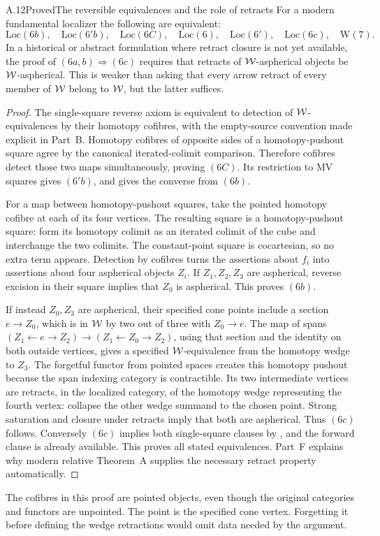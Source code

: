 \begin{claim}{A.12}{Proved}{The reversible equivalences and the role of retracts}
For a modern fundamental localizer the following are equivalent:
\[
\mathrm{Loc}(6b),\quad\mathrm{Loc}(6'b),\quad\mathrm{Loc}(6C),
\quad\mathrm{Loc}(6),\quad\mathrm{Loc}(6'),\quad\mathrm{Loc}(6c),
\quad\mathrm{W}(7).
\]
In a historical or abstract formulation where retract closure is not yet available, the proof of $(6a,b)\Rightarrow(6c)$ requires that retracts of $\mathcal{W}$-aspherical objects be $\mathcal{W}$-aspherical. This is weaker than asking that every arrow retract of every member of $\mathcal{W}$ belong to $\mathcal{W}$, but the latter suffices.
\end{claim}
\begin{proof}
The single-square reverse axiom is equivalent to detection of $\mathcal{W}$-equivalences by their homotopy cofibres, with the empty-source convention made explicit in Part~B. Homotopy cofibres of opposite sides of a homotopy-pushout square agree by the canonical iterated-colimit comparison. Therefore cofibres detect those two maps simultaneously, proving $(6C)$. Its restriction to MV squares gives $(6'b)$, and  gives the converse from $(6b)$.

For a map between homotopy-pushout squares, take the pointed homotopy cofibre at each of its four vertices. The resulting square is a homotopy-pushout square: form its homotopy colimit as an iterated colimit of the cube and interchange the two colimits. The constant-point square is cocartesian, so no extra term appears. Detection by cofibres turns the assertions about $f_i$ into assertions about four aspherical objects $Z_i$. If $Z_1,Z_2,Z_3$ are aspherical, reverse excision in their square implies that $Z_0$ is aspherical. This proves $(6b)$.

If instead $Z_0,Z_3$ are aspherical, their specified cone points include a section $e\to Z_0$, which is in $\mathcal{W}$ by two out of three with $Z_0\to e$. The map of spans $(Z_1\leftarrow e\to Z_2)\to(Z_1\leftarrow Z_0\to Z_2)$, using that section and the identity on both outside vertices, gives a specified $\mathcal{W}$-equivalence from the homotopy wedge to $Z_3$. The forgetful functor from pointed spaces creates this homotopy pushout because the span indexing category is contractible. Its two intermediate vertices are retracts, in the localized category, of the homotopy wedge representing the fourth vertex: collapse the other wedge summand to the chosen point. Strong saturation and closure under retracts imply that both are aspherical. Thus $(6c)$ follows. Conversely $(6c)$ implies both single-square clauses by , and the forward clause is already available. This proves all stated equivalences. Part~F explains why modern relative Theorem~A supplies the necessary retract property automatically.
\end{proof}
The cofibres in this proof are pointed objects, even though the original categories and functors are unpointed. The point is the specified cone vertex. Forgetting it before defining the wedge retractions would omit data needed by the argument.

